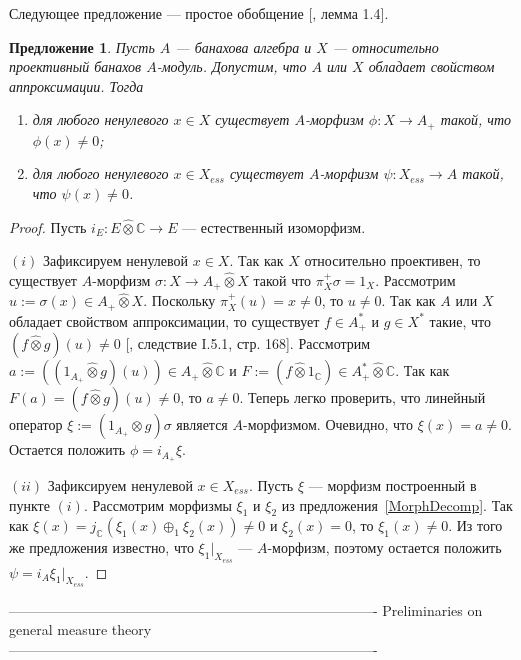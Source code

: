 \documentclass[12pt]{article}
\newtheorem{proposition}[theorem]{Предложение}
\newcommand{\projtens}{\mathbin{\widehat{\otimes}}}
\begin{document}
Следующее предложение --- простое обобщение [\cite{SelivBiprojBanAlg}, лемма
1.4].

\begin{proposition}\label{RelProjNecesCond} Пусть $A$ --- банахова алгебра и $X$
    --- относительно проективный банахов $A$-модуль. Допустим, что $A$ или $X$
    обладает свойством аппроксимации. Тогда
    \begin{enumerate}[label = (\roman*)]
        \item для любого ненулевого $x\in X$ существует $A$-морфизм $\phi:X\to
                  A_+$ такой, что $\phi(x)\neq 0$;

        \item для любого ненулевого $x\in X_{ess}$ существует $A$-морфизм
              $\psi:X_{ess}\to A$ такой, что $\psi(x)\neq 0$.
    \end{enumerate}
\end{proposition}
\begin{proof} Пусть $i_E:E\projtens \mathbb{C}\to E$ --- естественный
    изоморфизм.

    $(i)$ Зафиксируем ненулевой $x\in X$. Так как $X$ относительно проективен,
    то существует $A$-морфизм $\sigma:X\to A_+\projtens X$ такой что
    $\pi_X^+\sigma=1_X$. Рассмотрим $u:=\sigma(x)\in A_+\projtens X$. Поскольку
    $\pi_X^+(u)=x\neq 0$, то $u\neq 0$. Так как $A$ или $X$ обладает свойством
    аппроксимации, то существует $f\in A_+^*$ и $g\in X^*$ такие, что
    $(f\projtens g)(u)\neq 0$ [\cite{GrothProdTenTopNucl}, следствие I.5.1, стр.
            168]. Рассмотрим $a:=((1_{A_+}\projtens g)(u))\in A_+\projtens\mathbb{C}$ и
    $F:=(f\projtens 1_{\mathbb{C}})\in A_+^*\projtens\mathbb{C}$. Так как
    $F(a)=(f\projtens g)(u)\neq 0$, то $a\neq 0$. Теперь легко проверить, что
    линейный оператор $\xi:=(1_{A_+}\projtens g)\sigma$ является $A$-морфизмом.
    Очевидно, что $\xi(x)=a\neq 0$. Остается положить $\phi=i_{A_+}\xi$.

    $(ii)$ Зафиксируем ненулевой $x\in X_{ess}$. Пусть $\xi$ --- морфизм
    построенный в пункте $(i)$. Рассмотрим морфизмы $\xi_1$ и $\xi_2$ из
    предложения~\ref{MorphDecomp}. Так как
    $\xi(x)=j_{\mathbb{C}}(\xi_1(x)\oplus_1\xi_2(x))\neq 0$ и $\xi_2(x)=0$, то
    $\xi_1(x)\neq 0$. Из того же предложения известно, что $\xi_1|_{X_{ess}}$
    --- $A$-морфизм, поэтому остается положить $\psi=i_A \xi_1|_{X_{ess}}$.

\end{proof}

-------------------------------------------------------------------------------
Preliminaries on general measure theory
-------------------------------------------------------------------------------
\end{document}
